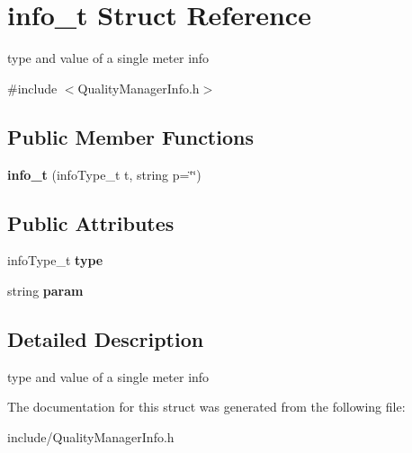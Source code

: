 \hypertarget{structinfo__t}{}\section{info\+\_\+t Struct Reference}
\label{structinfo__t}


type and value of a single meter info  




{\ttfamily \#include $<$Quality\+Manager\+Info.\+h$>$}

\subsection*{Public Member Functions}
\begin{DoxyCompactItemize}
\item 
\mbox{\label{structinfo__t_a8e5a523c323d595e486c4b29f0bbe5c8}} 
{\bfseries info\+\_\+t} (info\+Type\+\_\+t t, string p=\char`\"{}\char`\"{})
\end{DoxyCompactItemize}
\subsection*{Public Attributes}
\begin{DoxyCompactItemize}
\item 
\mbox{\label{structinfo__t_aff97eaf43d6cea77eb92080edd134d7c}} 
info\+Type\+\_\+t {\bfseries type}
\item 
\mbox{\label{structinfo__t_a07e951effa1f491d74ed6a31eab77412}} 
string {\bfseries param}
\end{DoxyCompactItemize}


\subsection{Detailed Description}
type and value of a single meter info 

The documentation for this struct was generated from the following file\+:\begin{DoxyCompactItemize}
\item 
include/Quality\+Manager\+Info.\+h\end{DoxyCompactItemize}
